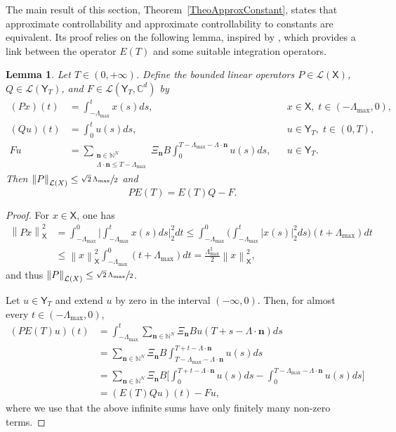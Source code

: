 \documentclass[JEP,XML,SOM,Unicode]{cedram}
\newcommand{\bn}{\boldsymbol{n}}
\theoremstyle{plain}
\newtheorem{lemm}[theo]{Lemma}
\theoremstyle{definition}
\newcommand{\norm}[1]{\left\lVert #1\right\lVert}
\newcommand{\abs}[1]{\left\lvert #1\right \rvert}
\newcommand{\bgabs}[1]{\biggl\lvert #1\biggr \rvert}
\begin{document}
The main result of this section, Theorem~\ref{TheoApproxConstant}, states that approximate controllability and approximate controllability to constants are equivalent. Its proof relies on the following lemma, inspired by \cite[Th.\,5.1]{Gohberg1989Inversion}, which provides a link between the operator $E(T)$ and some suitable integration operators.

\begin{lemm}
\label{LemmPETETQF}
Let $T \in (0, +\infty)$. Define the bounded linear operators $P \in \mathcal L(\mathsf X)$, $Q \in \mathcal L(\mathsf Y_T)$, and $F \in \mathcal L(\mathsf Y_T, \mathbb C^d)$ by
\begin{align*}
(P x)(t) & = \int_{-\Lambda_{\max}}^t x(s) ds, & & x \in \mathsf X,\; t \in (-\Lambda_{\max}, 0),  \\
(Q u)(t) & = \int_0^t u(s) ds, & & u \in \mathsf Y_T,\; t \in (0, T),  \\
F u & = \sum_{\substack{\bn \in \mathbb N^N \\ \Lambda \cdot \bn \leq T - \Lambda_{\max}}} \Xi_{\bn} B \int_0^{T - \Lambda_{\max} - \Lambda \cdot \bn} u(s) ds, & & u \in \mathsf Y_T.
\end{align*}
Then $\norm{P}_{\mathcal L(X)} \leq \sfrac{\sqrt{2}\,\Lambda_{\max}}{2}$ and
\begin{equation}
\label{EqPETETQF}
P E(T) = E(T) Q - F.
\end{equation}
\end{lemm}

\begin{proof}
For $x \in \mathsf X$, one has
\begin{align*}
\norm{P x}_{\mathsf X}^2 & = \int_{-\Lambda_{\max}}^0 \bgabs{\int_{-\Lambda_{\max}}^t x(s) ds}_2^2 dt \leq \int_{-\Lambda_{\max}}^0 \biggl(\int_{-\Lambda_{\max}}^t \abs{x(s)}_2^2 ds\biggr) (t + \Lambda_{\max}) dt  \\
& \leq \norm{x}_{\mathsf X}^2 \int_{-\Lambda_{\max}}^0 (t + \Lambda_{\max}) dt = \frac{\Lambda_{\max}^2}{2} \norm{x}_{\mathsf X}^2,
\end{align*}
and thus $\norm{P}_{\mathcal L(X)} \leq \sfrac{\sqrt{2}\,\Lambda_{\max}}{2}$.

Let $u \in \mathsf Y_T$ and extend $u$ by zero in the interval $(-\infty, 0)$. Then, for almost every $t \in (-\Lambda_{\max}, 0)$,
\begin{align*}
(P E(T) u)(t) & = \int_{-\Lambda_{\max}}^t \sum_{\bn \in \mathbb N^N} \Xi_{\bn} B u(T + s - \Lambda \cdot \bn) ds  \\
& = \sum_{\bn \in \mathbb N^N} \Xi_{\bn} B \int_{T - \Lambda_{\max} - \Lambda \cdot \bn}^{T + t - \Lambda \cdot \bn} u(s) ds  \\
& = \sum_{\bn \in \mathbb N^N} \Xi_{\bn} B \biggl[\int_0^{T + t - \Lambda \cdot \bn} u(s) ds - \int_0^{T - \Lambda_{\max} - \Lambda \cdot \bn} u(s) ds\biggr]  \\
& = (E(T) Q u)(t) - F u,
\end{align*}
where we use that the above infinite sums have only finitely many non-zero terms.
\end{proof}
\end{document}
